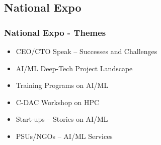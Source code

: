 \subsection{National Expo}
\begin{frame}[fragile=singleslide]{\insertsubsectionhead}
  \frametitle {National Expo - Themes}
\begin{center}
\begin{itemize}
   \item CEO/CTO Speak – Successes and Challenges
    \item AI/ML Deep-Tech Project Landscape
    \item Training Programs on AI/ML
    \item C-DAC Workshop on HPC
    \item Start-ups – Stories on AI/ML
    \item PSUs/NGOs – AI/ML Services
\end{itemize}
\end{center}
\end{frame}
%
%
%
